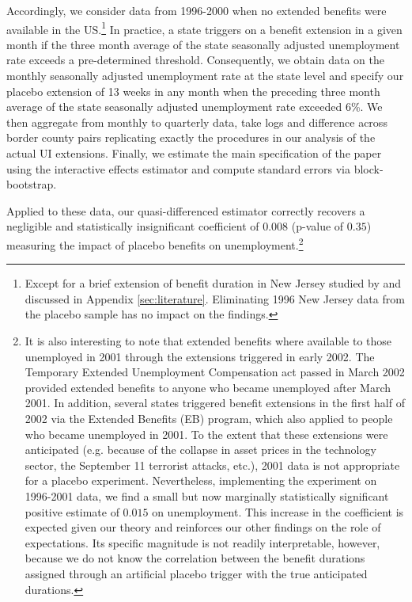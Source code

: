 \documentclass[12pt]{article}
\newcommand{\1}{\mathbf{1}}
\begin{document}
Accordingly, we consider data from 1996-2000 when no extended benefits were available in the US.\footnote{Except for a brief extension of benefit duration in New Jersey studied by \citet{card+levine:2000} and discussed in Appendix \ref{sec:literature}. Eliminating 1996 New Jersey data from the placebo sample has no impact on the findings.}
In practice, a state triggers on a benefit extension in a given month if the three month average of the state seasonally adjusted unemployment rate exceeds a pre-determined threshold. Consequently, we obtain data on the monthly seasonally adjusted unemployment rate at the state level and specify our placebo extension of 13 weeks in any month when the preceding three month average of the state seasonally adjusted unemployment rate exceeded 6\%. We then aggregate from monthly to quarterly data, take logs and difference across border county pairs replicating exactly the procedures in our analysis of the actual UI extensions. Finally, we estimate the main specification of the paper using the interactive effects estimator and compute standard errors via block-bootstrap.

Applied to these data, our quasi-differenced estimator correctly recovers a negligible and statistically insignificant coefficient of $0.008$ (p-value of $0.35$) measuring the impact of placebo benefits on unemployment.\footnote{It is also interesting to note that extended benefits where available to those unemployed in 2001 through the extensions triggered in early 2002. The Temporary Extended Unemployment Compensation act passed in March 2002 provided extended benefits to anyone who became unemployed after March 2001. In addition, several states triggered benefit extensions in the first half of 2002 via the Extended Benefits (EB) program, which also applied to people who became unemployed in 2001. To the extent that these extensions were anticipated (e.g. because of the collapse in asset prices in the technology sector, the September 11 terrorist attacks, etc.), 2001 data is not appropriate for a placebo experiment. Nevertheless, implementing the experiment on 1996-2001 data, we find a small but now marginally statistically significant positive estimate of $0.015$ on unemployment. This increase in the coefficient is expected given our theory and reinforces our other findings on the role of expectations. Its specific magnitude is not readily interpretable, however, because we do not know the correlation between the benefit durations assigned through an artificial placebo trigger with the true anticipated durations.}
\end{document}
